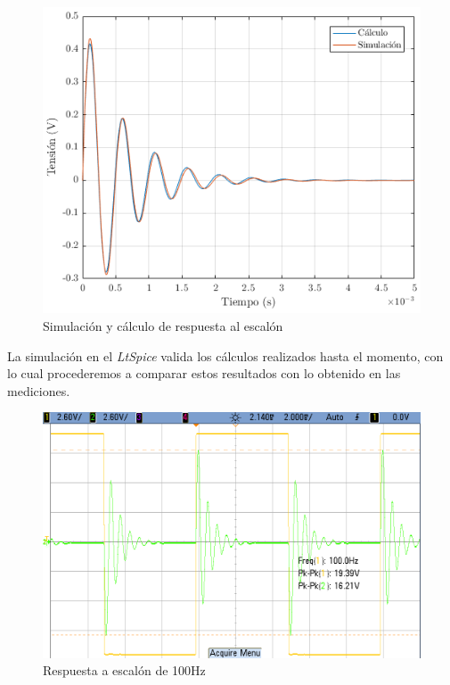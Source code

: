 \documentclass[../../tc_tp3_main.tex]{subfiles}
\begin{document}
\begin{figure}[H]
	\centering
  	\includegraphics[scale = 0.7]{imagenes/tc_tp3_ej1_rtaesc.png}
  	\caption{Simulaci\'on y c\'alculo de respuesta al escal\'on}
  	\label{fig:1-rtaesc-spice}
\end{figure}

La simulaci\'on en el \textit{LtSpice} valida los c\'alculos realizados hasta el momento, con lo cual procederemos a comparar estos resultados con lo obtenido en las mediciones.

\begin{figure}[H]
	\centering
  	\includegraphics[scale = 0.32]{imagenes/tc_tp3_ej1_100Hz.png}
  	\caption{Respuesta a escal\'on de 100Hz}
  	\label{fig:1-rtaesc-100Hz}
\end{figure}
\end{document}

